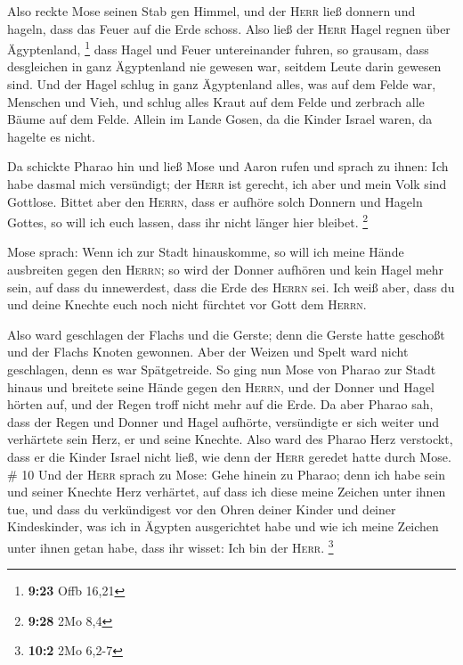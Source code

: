  Also reckte Mose seinen Stab gen Himmel, und der
\textsc{Herr} ließ donnern und hageln, dass das Feuer auf die Erde
schoss. Also ließ der \textsc{Herr} Hagel regnen über Ägyptenland,
\footnote{\textbf{9:23} Offb 16,21}  dass Hagel und Feuer
untereinander fuhren, so grausam, dass desgleichen in ganz Ägyptenland
nie gewesen war, seitdem Leute darin gewesen sind.  Und
der Hagel schlug in ganz Ägyptenland alles, was auf dem Felde war,
Menschen und Vieh, und schlug alles Kraut auf dem Felde und zerbrach
alle Bäume auf dem Felde.  Allein im Lande Gosen, da die
Kinder Israel waren, da hagelte es nicht.

 Da schickte Pharao hin und ließ Mose und Aaron rufen und
sprach zu ihnen: Ich habe dasmal mich versündigt; der \textsc{Herr} ist
gerecht, ich aber und mein Volk sind Gottlose.  Bittet
aber den \textsc{Herrn}, dass er aufhöre solch Donnern und Hageln
Gottes, so will ich euch lassen, dass ihr nicht länger hier bleibet.
\footnote{\textbf{9:28} 2Mo 8,4}

 Mose sprach: Wenn ich zur Stadt hinauskomme, so will ich
meine Hände ausbreiten gegen den \textsc{Herrn}; so wird der Donner
aufhören und kein Hagel mehr sein, auf dass du innewerdest, dass die
Erde des \textsc{Herrn} sei.  Ich weiß aber, dass du und
deine Knechte euch noch nicht fürchtet vor Gott dem \textsc{Herrn}.

 Also ward geschlagen der Flachs und die Gerste; denn die
Gerste hatte geschoßt und der Flachs Knoten gewonnen. 
Aber der Weizen und Spelt ward nicht geschlagen, denn es war
Spätgetreide.  So ging nun Mose von Pharao zur Stadt
hinaus und breitete seine Hände gegen den \textsc{Herrn}, und der Donner
und Hagel hörten auf, und der Regen troff nicht mehr auf die Erde.
 Da aber Pharao sah, dass der Regen und Donner und Hagel
aufhörte, versündigte er sich weiter und verhärtete sein Herz, er und
seine Knechte.  Also ward des Pharao Herz verstockt, dass
er die Kinder Israel nicht ließ, wie denn der \textsc{Herr} geredet
hatte durch Mose. \# 10  Und der \textsc{Herr} sprach zu
Mose: Gehe hinein zu Pharao; denn ich habe sein und seiner Knechte Herz
verhärtet, auf dass ich diese meine Zeichen unter ihnen tue,
 und dass du verkündigest vor den Ohren deiner Kinder und
deiner Kindeskinder, was ich in Ägypten ausgerichtet habe und wie ich
meine Zeichen unter ihnen getan habe, dass ihr wisset: Ich bin der
\textsc{Herr}. \footnote{\textbf{10:2} 2Mo 6,2-7}

